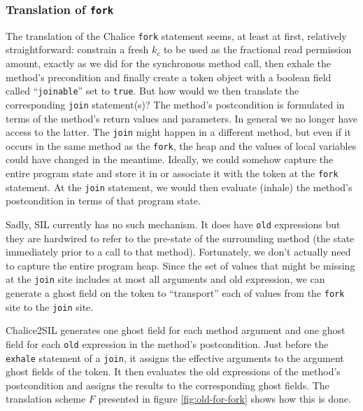 \subsubsection{Translation of \lstinline!fork!}\label{sct:fjfork}

The translation of the Chalice \lstinline!fork! statement seems, at least at first, relatively straightforward: constrain a fresh $k_c$ to be used as the fractional read permission amount, exactly as we did for the synchronous method call, then exhale the method's precondition and finally create a token object with a boolean field called ``\lstinline!joinable!'' set to \lstinline!true!.
But how would we then translate the corresponding \lstinline!join! statement(s)? The method's postcondition is formulated in terms of the method's return values and parameters.
In general we no longer have access to the latter.
The \lstinline!join! might happen in a different method, but even if it occurs in the same method as the \lstinline!fork!, the heap and the values of local variables could have changed in the meantime.
Ideally, we could somehow capture the entire program state and store it in or associate it with the token at the \lstinline!fork! statement.
At the \lstinline!join! statement, we would then evaluate (inhale) the method's postcondition in terms of that program state.

Sadly, SIL currently has no such mechanism. 
It does have \lstinline[language=SIL]!old! expressions but they are hardwired to refer to the pre-state of the surrounding method (the state immediately prior to a call to that method).
Fortunately, we don't actually need to capture the entire program heap. 
Since the set of values that might be missing at the \lstinline[language=SIL]!join! site includes at most all arguments and old expression, we can generate a ghost field on the token to ``transport'' each of values from the \lstinline!fork! site to the \lstinline!join! site.

Chalice2SIL generates one ghost field for each method argument and one ghost field for each \lstinline!old! expression in the method's postcondition. 
Just before the \lstinline!exhale! statement of a \lstinline!join!, it assigns the effective arguments to the argument ghost fields of the token. It then evaluates the old expressions of the method's postcondition and assigns the results to the corresponding ghost fields. 
The translation scheme $F$ presented in figure \ref{fig:old-for-fork} shows how this is done.

